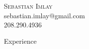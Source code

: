 \documentclass[9pt]{article}
\newenvironment{changemargin}[2]{%
  \begin{list}{}{%
    \setlength{\topsep}{0pt}%
    \setlength{\leftmargin}{#1}%
    \setlength{\rightmargin}{#2}%
    \setlength{\listparindent}{\parindent}%
    \setlength{\itemindent}{\parindent}%
    \setlength{\parsep}{\parskip}%
  }%
  \item[]}{\end{list}
}
\newcommand{\lineover}{
    \begin{changemargin}{-0.05in}{-0.05in}
        \vspace*{-8pt}
        \hrulefill \\
        \vspace*{-2pt}
    \end{changemargin}
}
\newcommand{\header}[1]{
    \begin{changemargin}{-0.5in}{-0.5in}
        \scshape{#1}\\
        \lineover
    \end{changemargin}
}
\newcommand{\contact}[4]{
    \begin{changemargin}{-0.5in}{-0.5in}
        \begin{center}
            {\Large \scshape {#1}}\\ \smallskip
            {#2}\\ \smallskip
            {#3}\\ \smallskip
            {#4}\smallskip
        \end{center}
    \end{changemargin}
}
\newenvironment{body} {
    \vspace*{-16pt}
    \begin{changemargin}{-0.20in}{-0.5in}
  }
    {\end{changemargin}
}
\begin{document}
\contact{Sebastian Imlay}{sebastian.imlay@gmail.com}{208.290.4936}








%
%



\header{Experience}
\end{document}

